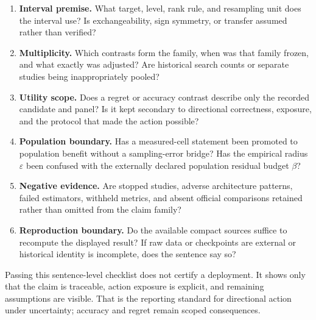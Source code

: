 \begin{enumerate}
  \item \textbf{Interval premise.} What target, level, rank rule, and resampling unit does the
  interval use?  Is exchangeability, sign symmetry, or transfer assumed rather than verified?

  \item \textbf{Multiplicity.} Which contrasts form the family, when was that family frozen, and
  what exactly was adjusted?  Are historical search counts or separate studies being inappropriately
  pooled?

  \item \textbf{Utility scope.} Does a regret or accuracy contrast describe only the recorded
  candidate and panel?  Is it kept secondary to directional correctness, exposure, and the protocol
  that made the action possible?

  \item \textbf{Population boundary.} Has a measured-cell statement been promoted to population
  benefit without a sampling-error bridge?  Has the empirical radius $\varepsilon$ been confused
  with the externally declared population residual budget $\beta$?

  \item \textbf{Negative evidence.} Are stopped studies, adverse architecture patterns, failed
  estimators, withheld metrics, and absent official comparisons retained rather than omitted from
  the claim family?

  \item \textbf{Reproduction boundary.} Do the available compact sources suffice to recompute the
  displayed result?  If raw data or checkpoints are external or historical identity is incomplete,
  does the sentence say so?
\end{enumerate}

Passing this sentence-level checklist does not certify a deployment.  It shows only that the claim
is traceable, action exposure is explicit, and remaining assumptions are visible.  That is the
reporting standard for directional action under uncertainty; accuracy and regret remain scoped
consequences.

